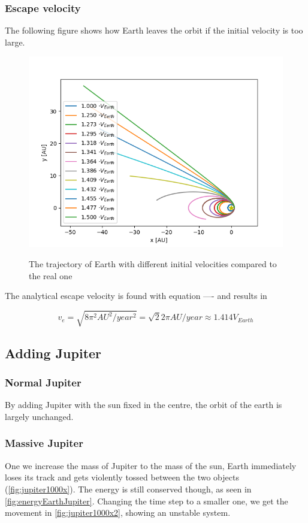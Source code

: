 \documentclass[10pt]{article}
\begin{document}
\begin{multicols}{2}
\subsubsection{Escape velocity}
The following figure
shows how Earth leaves the orbit if the initial velocity is too large.
\begin{figure}[H]
    \centering
    \includegraphics[width=1.0\linewidth]{../results/Esacpe_vel.png}
    \label{fig:name}
    \caption{The trajectory of Earth with different initial velocities compared to the real one}
\end{figure}

The analytical escape velocity is found with equation ---- and results in

\begin{equation}
    v_{e} = \sqrt{8\pi^2 AU^2/year^2} = \sqrt{2}2\pi AU/year \approx 1.414V_{Earth}\nonumber
\end{equation}


\subsection{Adding Jupiter}
\subsubsection{Normal Jupiter}
By adding Jupiter with the sun fixed in the centre, the orbit of the earth
is largely unchanged. 


\subsubsection{Massive Jupiter}
One we increase the mass of Jupiter to the mass of the sun, Earth
immediately loses its track and gets violently tossed between the two
objects (\cref{fig:jupiter1000x}). The energy is still conserved though,
as seen in \cref{fig:energyEarthJupiter}. Changing the time step to a
smaller one, we get the movement in \cref{fig:jupiter1000x2}, showing an
unstable system.


\end{multicols}
\end{document}
